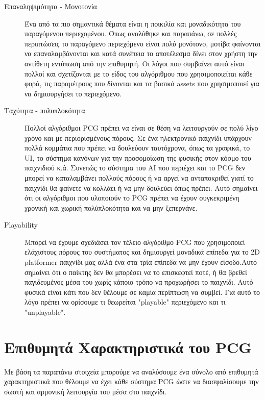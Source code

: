 \begin{description}
\item [Επαναληψιμότητα - Μονοτονία] Ένα από τα πιο σημαντικά θέματα είναι η ποικιλία και μοναδικότητα του παραγόμενου περιεχομένου. Όπως αναλύθηκε και παραπάνω, σε πολλές περιπτώσεις το παραγόμενο περιεχόμενο είναι πολύ μονότονο, μοτίβα φαίνονται να επαναλαμβάνονται και κατά συνέπεια το αποτέλεσμα δίνει στον χρήστη την αντίθετη εντύπωση από την επιθυμητή. Οι λόγοι που συμβαίνει αυτό είναι πολλοί και σχετίζονται με το είδος του αλγόριθμου που χρησιμοποιείται κάθε φορά, τις παραμέτρους που δίνονται και τα βασικά assets που χρησιμοποιεί για να δημιουργήσει το περιεχόμενο. 

\item [Ταχύτητα - πολυπλοκότητα] Πολλοί αλγόριθμοι PCG πρέπει να είναι σε θέση να λειτουργούν σε πολύ λίγο χρόνο και με περιορισμένους πόρους. Σε ένα ηλεκτρονικό παιχνίδι υπάρχουν πολλά κομμάτια που πρέπει να δουλεύουν ταυτόχρονα, όπως τα γραφικά, το UI, το σύστημα κανόνων για την προσομοίωση της φυσικής στον κόσμο του παιχνιδιού κ.ά. Συνεπώς το σύστημα του AI που περιέχει και το PCG δεν μπορεί να καταλαμβάνει πολλούς πόρους ή να αργεί να ανταποκριθεί γιατί το παιχνίδι θα φαίνετε να κολλάει ή να μην δουλεύει όπως πρέπει. Αυτό σημαίνει ότι οι αλγόριθμοι που υλοποιούν το PCG πρέπει να έχουν συγκεκριμένη χρονική και χωρική πολύπλοκότητα και να μην ξεπερνάνε.

\item [Playability] Μπορεί να έχουμε σχεδιάσει τον τέλειο αλγόριθμο PCG που χρησιμοποιεί ελάχιστους πόρους του συστήματος και δημιουργεί μοναδικά επίπεδα για το 2D platformer παιχνίδι μας αλλά ένα στα τρία επίπεδα να μην έχουν είσοδο.Αυτό σημαίνει ότι ο παίκτης δεν θα μπορέσει να το επισκεφτεί ποτέ, ή θα βρεθεί παγιδευμένος μέσα του χωρίς κάποιο τρόπο να προχωρήσει το παιχνίδι. Αυτό φυσικά είναι κάτι που δεν θέλουμε σε καμία περίπτωση να συμβεί. Για αυτό το λόγο πρέπει να ορίσουμε τι θεωρείται "playable" περιεχόμενο και τι "unplayable".
 
\end{description}


\section{Επιθυμητά Χαρακτηριστικά του PCG}
Με βάση τα παραπάνω στοιχεία μπορούμε να αναλύσουμε ένα σύνολο από επιθυμητά χαρακτηριστικά που θέλουμε να έχει κάθε σύστημα PCG ώστε να διασφαλίσουμε την σωστή και αρμονική λειτουργία του μέσα στο παιχνίδι.

